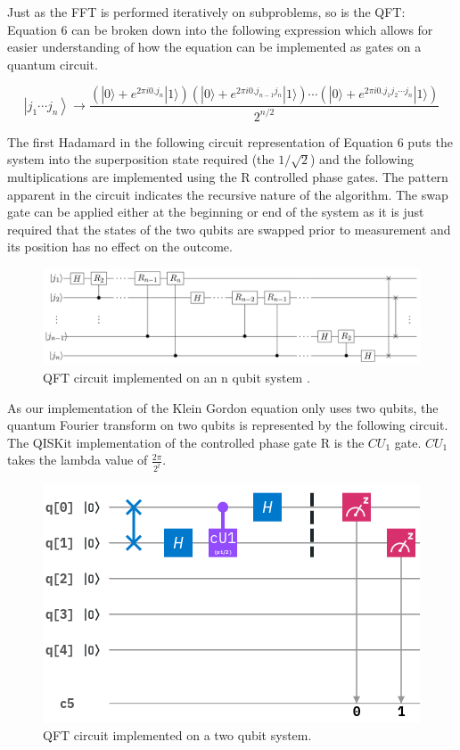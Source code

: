 \documentclass{article}
\begin{document}
Just as the FFT is performed iteratively on subproblems, so is the QFT: Equation 6 can be broken down into the following expression which allows for easier understanding of how the equation can be implemented as gates on a quantum circuit.

\begin{equation}
\left|j_{1} \cdots j_{n}\right\rangle \rightarrow \frac{\left(|0\rangle+ e^{2 \pi i 0 . j_{n}}|1\rangle\right)\left(|0\rangle+ e^{2 \pi i 0 . j_{n-1} j_{n}}|1\rangle\right) \cdots\left(|0\rangle+ e^{2 \pi i 0 . j_{1} j_{2} \cdots j_{n}}|1\rangle\right)}{2^{n / 2}}
\end{equation}

The first Hadamard in the following circuit representation of Equation 6 puts the system into the superposition state required (the $1/\sqrt{2}$) and the following multiplications are implemented using the R controlled phase gates. The pattern apparent in the circuit indicates the recursive nature of the algorithm. The swap gate can be applied either at the beginning or end of the system as it is just required that the states of the two qubits are swapped prior to measurement and its position has no effect on the outcome.

\newpage
\begin{figure}[!htb]
\includegraphics[scale=0.35]{../images/qft_circuit}
  \centering
  \caption{QFT circuit implemented on an n qubit system \cite{jurgen}.}
\end{figure}

As our implementation of the Klein Gordon equation only uses two qubits, the quantum Fourier transform on two qubits is represented by the following circuit. The QISKit implementation of the controlled phase gate R is the $CU_1$ gate. $CU_1$ takes the lambda value of $\frac{2\pi}{2^t}$.

\begin{figure}[!htb]
\includegraphics[scale=0.5]{../images/qft_two}
  \centering
  \caption{QFT circuit implemented on a two qubit system.}
\end{figure}
\end{document}
